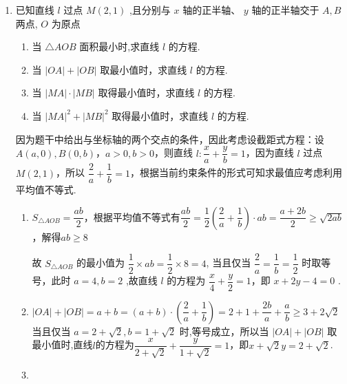 \begin{enumerate}
\begin{enumerate}
\begin{jieda}
            所以 ${MN}$ 所在直线的方程为 $\dfrac{y + \dfrac{5}{2}}{\dfrac{5}{2}} = \dfrac{x}{1}$, 即 ${5x} - {2y} - 5 = 0$ .
        \end{jieda}
        \item 已知直线 $l$ 过点 $M\left( {2,1}\right)$ ,且分别与 $x$ 轴的正半轴、 $y$ 轴的正半轴交于 $A,B$ 两点, $O$ 为原点
        \begin{enumerate}
            \item 当 $\bigtriangleup  {AOB}$ 面积最小时,求直线 $l$ 的方程.
            \item 当 $\left| {OA}\right|  + \left| {OB}\right|$ 取最小值时，求直线 $l$ 的方程.
            \item 当 $\left| {MA}\right|  \cdot  \left| {MB}\right|$ 取得最小值时，求直线 $l$ 的方程.
            \item 当 ${\left| MA\right| }^{2} + {\left| MB\right| }^{2}$ 取得最小值时，求直线 $l$ 的方程.
        \end{enumerate}
        \begin{jieda}
            因为题干中给出与坐标轴的两个交点的条件，因此考虑设截距式方程：设$A(a, 0), B(0, b)$，$a > 0,b > 0$，则直线 $l : \dfrac{x}{a} + \dfrac{y}{b} = 1$，因为直线 $l$ 过点 $M\left( {2,1}\right)$，所以 $\dfrac{2}{a} + \dfrac{1}{b} = 1$，根据当前约束条件的形式可知求最值应考虑利用平均值不等式.

            \begin{enumerate}
                \item $S_{\bigtriangleup  {AOB}} = \dfrac{ab}{2}$，根据平均值不等式有$\dfrac{ab}{2} = \dfrac{1}{2}\left(\dfrac{2}{a} + \dfrac{1}{b}\right)\cdot ab = \dfrac{a+2b}{2} \geq \sqrt{2ab}$，解得$ab \geq 8$
            
                故 ${S}_{\bigtriangleup {AOB}}$ 的最小值为 $\dfrac{1}{2} \times  {ab} = \dfrac{1}{2} \times  8 = 4$, 当且仅当 $\dfrac{2}{a} = \dfrac{1}{b} = \dfrac{1}{2}$ 时取等号，此时 $a = 4,b = 2$ ,故直线 $l$ 的方程为 $\dfrac{x}{4} + \dfrac{y}{2} = 1$，即 $x + {2y} - 4 = 0$ .

                \item $\left| {OA}\right|  + \left| {OB}\right| = a + b = (a+b)\cdot\left(\dfrac{2}{a} + \dfrac{1}{b}\right) = 2+1+\dfrac{2b}{a}+\dfrac{a}{b} \geq 3+2\sqrt{2}$当且仅当 $a = 2 + \sqrt{2},b = 1 + \sqrt{2}$ 时,等号成立，所以当 $\left| {OA}\right|  + \left| {OB}\right|$ 取最小值时,直线$l$的方程为$\dfrac{x}{2+\sqrt{2}} + \dfrac{y}{1+\sqrt{2}} = 1$，即$x + \sqrt{2}y = 2 + \sqrt{2}$.

                \item 
\end{enumerate}
\end{jieda}
\end{enumerate}
\end{enumerate}
